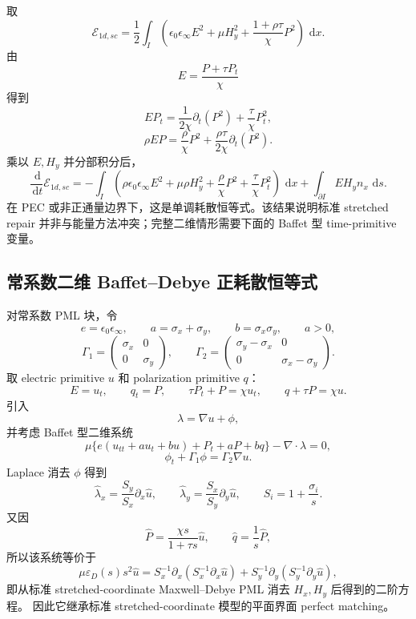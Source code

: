 \documentclass[UTF8,a4paper,11pt]{ctexart}
\newcommand{\dd}{\,\mathrm d}
\newcommand{\Ecal}{\mathcal E}
\newcommand{\eps}{\varepsilon}
\begin{document}
取
\[
\boxed{
\Ecal_{1d,sc}
=\frac12\int_I\left(
\epsilon_0\epsilon_\infty E^2+\mu H_y^2
+\frac{1+\rho\tau}{\chi}P^2
\right)\,\dd x.}
\]
由
\[
E=\frac{P+\tau P_t}{\chi}
\]
得到
\[
E P_t=\frac{1}{2\chi}\partial_t(P^2)+\frac{\tau}{\chi}P_t^2,
\]
\[
\rho E P
=\frac{\rho}{\chi}P^2+\frac{\rho\tau}{2\chi}\partial_t(P^2).
\]
乘以 \(E,H_y\) 并分部积分后，
\[
\boxed{
\frac{\dd}{\dd t}\Ecal_{1d,sc}
=-\int_I\left(
\rho\epsilon_0\epsilon_\infty E^2
+\mu\rho H_y^2
+\frac{\rho}{\chi}P^2
+\frac{\tau}{\chi}P_t^2
\right)\,\dd x
+\int_{\partial I}EH_y n_x\,\dd s.}
\]
在 PEC 或非正通量边界下，这是单调耗散恒等式。该结果说明标准 stretched repair
并非与能量方法冲突；完整二维情形需要下面的 Baffet 型 time-primitive 变量。

\subsection{常系数二维 Baffet--Debye 正耗散恒等式}

对常系数 PML 块，令
\[
e=\epsilon_0\epsilon_\infty,\qquad
a=\sigma_x+\sigma_y,\qquad b=\sigma_x\sigma_y,\qquad a>0,
\]
\[
\Gamma_1=\begin{pmatrix}\sigma_x&0\\0&\sigma_y\end{pmatrix},\qquad
\Gamma_2=\begin{pmatrix}\sigma_y-\sigma_x&0\\0&\sigma_x-\sigma_y\end{pmatrix}.
\]
取 electric primitive \(u\) 和 polarization primitive \(q\)：
\[
E=u_t,\qquad q_t=P,\qquad \tau P_t+P=\chi u_t,\qquad q+\tau P=\chi u.
\]
引入
\[
\lambda=\nabla u+\phi,
\]
并考虑 Baffet 型二维系统
\[
\mu\{e(u_{tt}+a u_t+b u)+P_t+aP+bq\}-\nabla\cdot\lambda=0,
\]
\[
\phi_t+\Gamma_1\phi=\Gamma_2\nabla u.
\]
Laplace 消去 \(\phi\) 得到
\[
\widehat\lambda_x=\frac{S_y}{S_x}\partial_x\widehat u,\qquad
\widehat\lambda_y=\frac{S_x}{S_y}\partial_y\widehat u,\qquad
S_i=1+\frac{\sigma_i}{s}.
\]
又因
\[
\widehat P=\frac{\chi s}{1+\tau s}\widehat u,\qquad
\widehat q=\frac1s\widehat P,
\]
所以该系统等价于
\[
\mu\eps_D(s)s^2\widehat u
=S_x^{-1}\partial_x(S_x^{-1}\partial_x\widehat u)
+S_y^{-1}\partial_y(S_y^{-1}\partial_y\widehat u),
\]
即从标准 stretched-coordinate Maxwell--Debye PML 消去 \(H_x,H_y\) 后得到的二阶方程。
因此它继承标准 stretched-coordinate 模型的平面界面 perfect matching。
\end{document}
